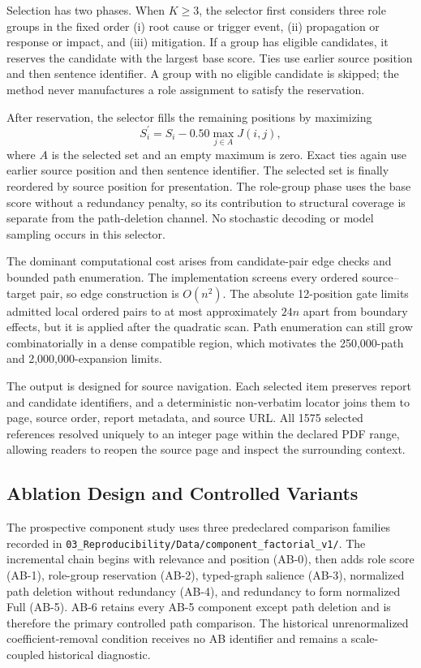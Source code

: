 \documentclass[applsci,article,submit,moreauthors]{Definitions/mdpi}
\begin{document}
Selection has two phases. When $K\geq3$, the selector first considers three role groups in the fixed order (i) root cause or trigger event, (ii) propagation or response or impact, and (iii) mitigation. If a group has eligible candidates, it reserves the candidate with the largest base score. Ties use earlier source position and then sentence identifier. A group with no eligible candidate is skipped; the method never manufactures a role assignment to satisfy the reservation.

After reservation, the selector fills the remaining positions by maximizing
\begin{equation}
S_i^{\prime}=S_i-0.50\max_{j\in A}J(i,j),
\end{equation}
where $A$ is the selected set and an empty maximum is zero. Exact ties again use earlier source position and then sentence identifier. The selected set is finally reordered by source position for presentation. The role-group phase uses the base score without a redundancy penalty, so its contribution to structural coverage is separate from the path-deletion channel. No stochastic decoding or model sampling occurs in this selector.

The dominant computational cost arises from candidate-pair edge checks and bounded path enumeration. The implementation screens every ordered source--target pair, so edge construction is $O(n^2)$. The absolute 12-position gate limits admitted local ordered pairs to at most approximately $24n$ apart from boundary effects, but it is applied after the quadratic scan. Path enumeration can still grow combinatorially in a dense compatible region, which motivates the 250,000-path and 2,000,000-expansion limits.

The output is designed for source navigation. Each selected item preserves report and candidate identifiers, and a deterministic non-verbatim locator joins them to page, source order, report metadata, and source URL. All 1575 selected references resolved uniquely to an integer page within the declared PDF range, allowing readers to reopen the source page and inspect the surrounding context.

\subsection{Ablation Design and Controlled Variants}

The prospective component study uses three predeclared comparison families recorded in \nolinkurl{03_Reproducibility/Data/component_factorial_v1/}. The incremental chain begins with relevance and position (AB-0), then adds role score (AB-1), role-group reservation (AB-2), typed-graph salience (AB-3), normalized path deletion without redundancy (AB-4), and redundancy to form normalized Full (AB-5). AB-6 retains every AB-5 component except path deletion and is therefore the primary controlled path comparison. The historical unrenormalized coefficient-removal condition receives no AB identifier and remains a scale-coupled historical diagnostic.
\end{document}
